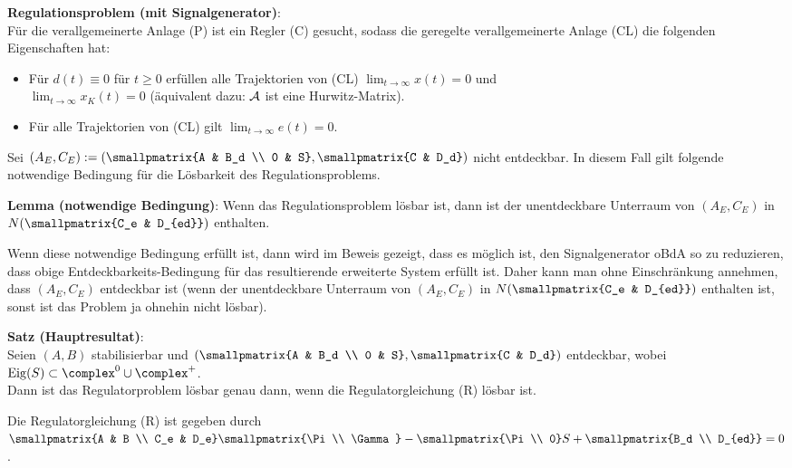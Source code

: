 \textbf{Regulationsproblem (mit Signalgenerator)}:\\
Für die verallgemeinerte Anlage (P) ist ein Regler (C) gesucht, sodass die geregelte
verallgemeinerte Anlage (CL) die folgenden Eigenschaften hat:
\begin{itemize}
    \item
    Für $d(t) \equiv 0$ für $t \ge 0$ erfüllen alle Trajektorien von (CL)
    $\lim_{t \to \infty} x(t) = 0$ und\\
    $\lim_{t \to \infty} x_K(t) = 0$
    (äquivalent dazu: $\mathcal{A}$ ist eine Hurwitz-Matrix).
    
    \item
    Für alle Trajektorien von (CL) gilt $\lim_{t \to \infty} e(t) = 0$.
\end{itemize}

\linie

Sei $(A_E, C_E) := \left(\smallpmatrix{A & B_d \\ 0 & S}, \smallpmatrix{C & D_d}\right)$
nicht entdeckbar.
In diesem Fall gilt folgende notwendige Bedingung für die Lösbarkeit des Regulationsproblems.

\textbf{Lemma (notwendige Bedingung)}:
Wenn das Regulationsproblem lösbar ist, dann ist der unentdeckbare Unterraum von
$(A_E, C_E)$ in $N(\smallpmatrix{C_e & D_{ed}})$ enthalten.

Wenn diese notwendige Bedingung erfüllt ist, dann wird im Beweis gezeigt, dass es möglich ist,
den Signalgenerator oBdA so zu reduzieren, dass obige Entdeckbarkeits-Bedingung für das
resultierende erweiterte System erfüllt ist.
Daher kann man ohne Einschränkung annehmen, dass $(A_E, C_E)$ entdeckbar ist
(wenn der unentdeckbare Unterraum von
$(A_E, C_E)$ in $N(\smallpmatrix{C_e & D_{ed}})$ enthalten ist,
sonst ist das Problem ja ohnehin nicht lösbar).

\linie

\textbf{Satz (Hauptresultat)}:\\
Seien $(A, B)$ stabilisierbar und
$\left(\smallpmatrix{A & B_d \\ 0 & S}, \smallpmatrix{C & D_d}\right)$ entdeckbar,
wobei $\Eig(S) \subset \complex^0 \cup \complex^+$.\\
Dann ist das Regulatorproblem lösbar genau dann, wenn die Regulatorgleichung (R) lösbar ist.

Die Regulatorgleichung (R) ist gegeben durch
$\smallpmatrix{A & B \\ C_e & D_e} \smallpmatrix{\Pi \\ \Gamma} -
\smallpmatrix{\Pi \\ 0} S + \smallpmatrix{B_d \\ D_{ed}} = 0$.

